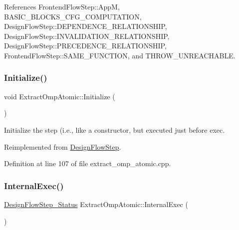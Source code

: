References Frontend\+Flow\+Step\+::\+AppM, B\+A\+S\+I\+C\+\_\+\+B\+L\+O\+C\+K\+S\+\_\+\+C\+F\+G\+\_\+\+C\+O\+M\+P\+U\+T\+A\+T\+I\+ON, Design\+Flow\+Step\+::\+D\+E\+P\+E\+N\+D\+E\+N\+C\+E\+\_\+\+R\+E\+L\+A\+T\+I\+O\+N\+S\+H\+IP, Design\+Flow\+Step\+::\+I\+N\+V\+A\+L\+I\+D\+A\+T\+I\+O\+N\+\_\+\+R\+E\+L\+A\+T\+I\+O\+N\+S\+H\+IP, Design\+Flow\+Step\+::\+P\+R\+E\+C\+E\+D\+E\+N\+C\+E\+\_\+\+R\+E\+L\+A\+T\+I\+O\+N\+S\+H\+IP, Frontend\+Flow\+Step\+::\+S\+A\+M\+E\+\_\+\+F\+U\+N\+C\+T\+I\+ON, and T\+H\+R\+O\+W\+\_\+\+U\+N\+R\+E\+A\+C\+H\+A\+B\+LE.

\mbox{\label{classExtractOmpAtomic_a4895f8dc863df77a8e52069c00425977}} 
\subsubsection{\texorpdfstring{Initialize()}{Initialize()}}
{\footnotesize\ttfamily void Extract\+Omp\+Atomic\+::\+Initialize (\begin{DoxyParamCaption}{ }\end{DoxyParamCaption})\hspace{0.3cm}{\ttfamily [virtual]}}



Initialize the step (i.\+e., like a constructor, but executed just before exec. 



Reimplemented from \hyperlink{classDesignFlowStep_a44b50683382a094976e1d432a7784799}{Design\+Flow\+Step}.



Definition at line 107 of file extract\+\_\+omp\+\_\+atomic.\+cpp.

\mbox{\label{classExtractOmpAtomic_a15be85728c9e9cbfe5db4c754e196782}} 
\subsubsection{\texorpdfstring{Internal\+Exec()}{InternalExec()}}
{\footnotesize\ttfamily \hyperlink{design__flow__step_8hpp_afb1f0d73069c26076b8d31dbc8ebecdf}{Design\+Flow\+Step\+\_\+\+Status} Extract\+Omp\+Atomic\+::\+Internal\+Exec (\begin{DoxyParamCaption}{ }\end{DoxyParamCaption})\hspace{0.3cm}{\ttfamily [virtual]}}



